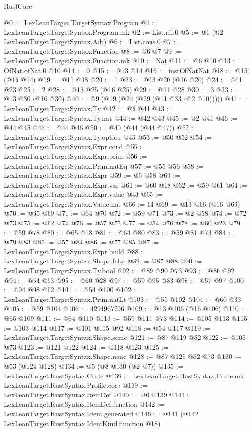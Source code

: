 \begin{lexlean}{RustCore}
\begin{coremodule}
@0 := LexLeanTarget.TargetSyntax.Program
@1 := LexLeanTarget.TargetSyntax.Program.mk
@2 := List.nil.{0}
@5 := @1 (@2 LexLeanTarget.TargetSyntax.Adt)
@6 := List.cons.{0}
@7 := LexLeanTarget.TargetSyntax.Function
@8 := @6 @7
@9 := LexLeanTarget.TargetSyntax.Function.mk
@10 := Nat
@11 := @6 @10
@13 := OfNat.ofNat.{0} @10
@14 := 0
@15 := @13 @14
@16 := instOfNatNat
@18 := @15 (@16 @14)
@19 := @11 @18
@20 := 1
@23 := @13 @20 (@16 @20)
@24 := @11 @23
@25 := 2
@28 := @13 @25 (@16 @25)
@29 := @11 @28
@30 := 3
@33 := @13 @30 (@16 @30)
@40 := @9 (@19 (@24 (@29 (@11 @33 (@2 @10)))))
@41 := LexLeanTarget.TargetSyntax.Ty
@42 := @6 @41
@43 := LexLeanTarget.TargetSyntax.Ty.nat
@44 := @42 @43
@45 := @2 @41
@46 := @44 @45
@47 := @44 @46
@50 := @40 (@44 (@44 @47))
@52 := LexLeanTarget.TargetSyntax.Ty.option @43
@53 := @50 @52
@54 := LexLeanTarget.TargetSyntax.Expr.cond
@55 := LexLeanTarget.TargetSyntax.Expr.prim
@56 := LexLeanTarget.TargetSyntax.Prim.natEq
@57 := @55 @56
@58 := LexLeanTarget.TargetSyntax.Expr
@59 := @6 @58
@60 := LexLeanTarget.TargetSyntax.Expr.var
@61 := @60 @18
@62 := @59 @61
@64 := LexLeanTarget.TargetSyntax.Expr.value @43
@65 := LexLeanTarget.TargetSyntax.Value.nat
@66 := 14
@69 := @13 @66 (@16 @66)
@70 := @65 @69
@71 := @64 @70
@72 := @59 @71
@73 := @2 @58
@74 := @72 @73
@75 := @62 @74
@76 := @57 @75
@77 := @54 @76
@78 := @60 @23
@79 := @59 @78
@80 := @65 @18
@81 := @64 @80
@83 := @59 @81 @73
@84 := @79 @83
@85 := @57 @84
@86 := @77 @85
@87 := LexLeanTarget.TargetSyntax.Expr.build
@88 := LexLeanTarget.TargetSyntax.Shape.false
@89 := @87 @88
@90 := LexLeanTarget.TargetSyntax.Ty.bool
@92 := @89 @90 @73
@93 := @86 @92
@94 := @54 @93
@95 := @60 @28
@97 := @59 @95 @83
@98 := @57 @97
@100 := @94 @98 @92
@101 := @54 @100
@102 := LexLeanTarget.TargetSyntax.Prim.natLt
@103 := @55 @102
@104 := @60 @33
@105 := @59 @104
@106 := 4294967296
@109 := @13 @106 (@16 @106)
@110 := @65 @109
@111 := @64 @110
@113 := @59 @111 @73
@114 := @105 @113
@115 := @103 @114
@117 := @101 @115 @92
@118 := @54 @117
@119 := LexLeanTarget.TargetSyntax.Shape.some
@121 := @87 @119 @52
@122 := @105 @73
@123 := @121 @122
@124 := @118 @123
@125 := LexLeanTarget.TargetSyntax.Shape.none
@128 := @87 @125 @52 @73
@130 := @53 (@124 @128)
@134 := @5 (@8 @130 (@2 @7))
@135 := LexLeanTarget.RustSyntax.Crate
@138 := LexLeanTarget.RustSyntax.Crate.mk LexLeanTarget.RustSyntax.Profile.core
@139 := LexLeanTarget.RustSyntax.ItemDef
@140 := @6 @139
@141 := LexLeanTarget.RustSyntax.ItemDef.function
@142 := LexLeanTarget.RustSyntax.Ident.generated
@146 := @141 (@142 LexLeanTarget.RustSyntax.IdentKind.function @18)

\end{coremodule}
\end{lexlean}
